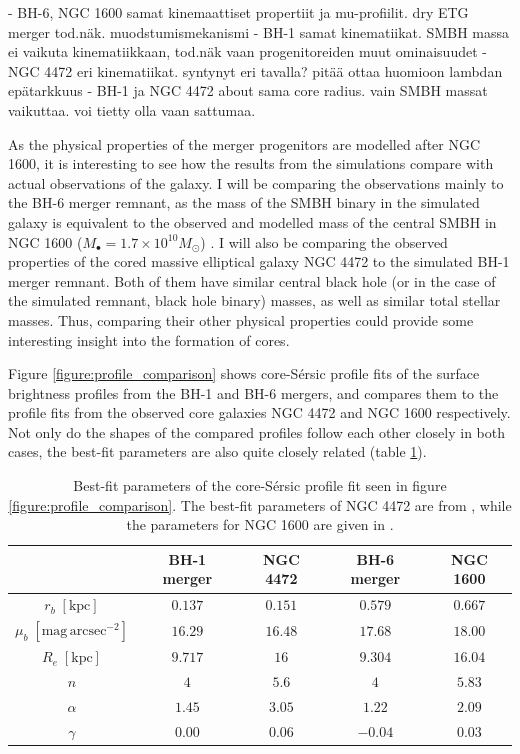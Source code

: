 \documentclass[english, oneside]{HYgradu}
\begin{document}
- BH-6, NGC 1600 samat kinemaattiset propertiit ja mu-profiilit. dry ETG merger tod.näk. muodstumismekanismi
- BH-1 samat kinematiikat. SMBH massa ei vaikuta kinematiikkaan, tod.näk vaan progenitoreiden muut ominaisuudet
- NGC 4472 eri kinematiikat. syntynyt eri tavalla? pitää ottaa huomioon lambdan epätarkkuus
- BH-1 ja NGC 4472 about sama core radius. vain SMBH massat vaikuttaa. voi tietty olla vaan sattumaa.

As the physical properties of the merger progenitors are modelled after NGC 1600, it is interesting to see how the results from the simulations compare with actual observations of the galaxy. I will be comparing the observations mainly to the BH-6 merger remnant, as the mass of the SMBH binary in the simulated galaxy is equivalent to the observed and modelled mass of the central SMBH in NGC 1600 ($M_\bullet = 1.7 \times 10^{10} M_\odot$) \citep{Thomas2016}. I will also be comparing the observed properties of the cored massive elliptical galaxy NGC 4472 to the simulated BH-1 merger remnant. Both of them have similar central black hole (or in the case of the simulated remnant, black hole binary) masses, as well as similar total stellar masses. Thus, comparing their other physical properties could provide some interesting insight into the formation of cores.

Figure \ref{figure:profile_comparison} shows core-Sérsic profile fits of the surface brightness profiles from the BH-1 and BH-6 mergers, and compares them to the profile fits from the observed core galaxies NGC 4472 and NGC 1600 respectively. Not only do the shapes of the compared profiles follow each other closely in both cases, the best-fit parameters are also quite closely related (table \ref{table:bestfit_parameter_comparison}). 

\begin{table}
	\begin{center}
		\scriptsize
		\begin{tabular}{| c | c c | c c |}
		\hline
		 & BH-1 merger & NGC 4472 & BH-6 merger & NGC 1600 \\
		\hline
		$r_b \; \mathrm{[kpc]}$ & $0.137$ & $0.151$ & $0.579$ & $0.667$ \\
		$\mu_b \; \mathrm{[mag \, arcsec^{-2}]}$ & $16.29$ & $16.48$ & $17.68$ & $18.00$ \\
		$R_e \; \mathrm{[kpc]}$ & $9.717$ & $16$ & $9.304$ & $16.04$ \\
		$n$ & $4$ & $5.6$ & $4$ & $5.83$ \\
		$\alpha$ & $1.45$ & $3.05$ & $1.22$ & $2.09$ \\
		$\gamma$ & $0.00$ & $0.06$ & $-0.04$ & $0.03$ \\
		\hline
		\end{tabular}
	\end{center}
	\caption{Best-fit parameters of the core-Sérsic profile fit seen in figure \ref{figure:profile_comparison}. The best-fit parameters of NGC 4472 are from \cite{Rusli2013}, while the parameters for NGC 1600 are given in \cite{Thomas2016}.}
	\label{table:bestfit_parameter_comparison}
\end{table}
\end{document}
